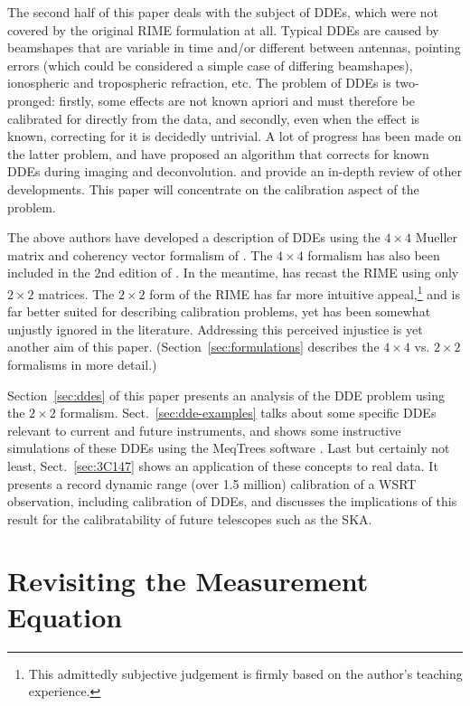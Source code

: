 \documentclass[]{aa}
\begin{document}
The second half of this paper deals with the subject of DDEs, which were not covered by the original RIME formulation at all. Typical DDEs are caused by beamshapes that are variable in time and/or different between antennas, pointing errors (which could be considered a simple case of differing beamshapes), ionospheric and tropospheric refraction, etc. The problem of DDEs is two-pronged: firstly, some effects are not known apriori and must therefore be calibrated for directly from the data, and secondly, even when the effect is known, correcting for it is decidedly untrivial. A lot of progress has been made on the latter problem, and \citet{SB:imageplane} have proposed an algorithm that corrects for known DDEs during imaging and deconvolution. \citet{Rau:DDEs} and \citet{SB:calibration-low-freq} provide an in-depth review of other developments. This paper will concentrate on the calibration aspect of the problem.

The above authors have developed a description of DDEs using the $4\times4$ Mueller matrix and coherency vector formalism of \citet{ME1}. The $4\times4$ formalism has also been included in the 2nd edition of \citet*[Sect.~4.8]{tms}. In the meantime, \citet{ME4} has recast the RIME using only $2\times2$ matrices. The $2\times2$ form of the RIME has far more intuitive appeal,\footnote{This admittedly subjective judgement is firmly based on the author's teaching experience.} and is far better suited for describing calibration problems, yet has been somewhat unjustly ignored in the literature. Addressing this perceived injustice is yet another aim of this paper. (Section~\ref{sec:formulations} describes the $4\times4$ vs. $2\times2$ formalisms in more detail.)

Section~\ref{sec:ddes} of this paper presents an analysis of the DDE problem using the $2\times2$ formalism. Sect.~\ref{sec:dde-examples} talks about some specific DDEs relevant to current and future instruments, and shows some instructive simulations of these DDEs using the MeqTrees software \citep{meqtrees}. Last but certainly not least, Sect.~\ref{sec:3C147} shows an application of these concepts to real data. It presents a record dynamic range (over 1.5 million) calibration of a WSRT observation, including calibration of DDEs, and discusses the implications of this result for the calibratability of future telescopes such as the SKA.

\section{\label{sec:derivation}Revisiting the Measurement Equation}
\end{document}
